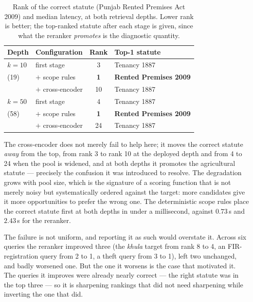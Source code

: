 \documentclass[conference]{IEEEtran}
\begin{document}
\begin{table}[t]
\caption{Rank of the correct statute (Punjab Rented Premises Act 2009) and
median latency, at both retrieval depths. Lower rank is better; the top-ranked
statute after each stage is given, since what the reranker \emph{promotes} is
the diagnostic quantity.}
\label{tab:rerank}
\centering
\small
\begin{tabular}{@{}llcl@{}}
\toprule
Depth & Configuration & Rank & Top-1 statute \\
\midrule
$k{=}10$ & first stage           & 3  & Tenancy 1887 \\
(19)     & $+$ scope rules       & \textbf{1} & \textbf{Rented Premises 2009} \\
         & $+$ cross-encoder     & 10 & Tenancy 1887 \\
\midrule
$k{=}50$ & first stage           & 4  & Tenancy 1887 \\
(58)     & $+$ scope rules       & \textbf{1} & \textbf{Rented Premises 2009} \\
         & $+$ cross-encoder     & 24 & Tenancy 1887 \\
\bottomrule
\end{tabular}
\end{table}

The cross-encoder does not merely fail to help here; it moves the correct
statute \emph{away} from the top, from rank 3 to rank 10 at the deployed depth
and from 4 to 24 when the pool is widened, and at both depths it promotes the
agricultural statute --- precisely the confusion it was introduced to resolve.
The degradation grows with pool size, which is the signature of a scoring
function that is not merely noisy but systematically ordered against the target:
more candidates give it more opportunities to prefer the wrong one. The
deterministic scope rules place the correct statute first at both depths in
under a millisecond, against $0.73$\,s and $2.43$\,s for the reranker.

The failure is not uniform, and reporting it as such would overstate it. Across
six queries the reranker improved three (the \emph{khula} target from rank 8 to
4, an FIR-registration query from 2 to 1, a theft query from 3 to 1), left two
unchanged, and badly worsened one. But the one it worsens is the case that
motivated it. The queries it improves were already nearly correct --- the right
statute was in the top three --- so it is sharpening rankings that did not need
sharpening while inverting the one that did.
\end{document}
